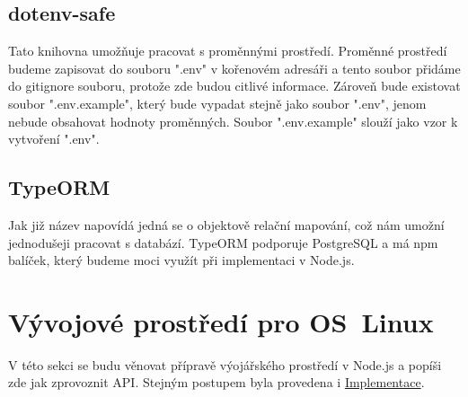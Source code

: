 \documentclass[thesis=B,czech]{FITthesis}[2012/06/26]
\begin{document}
        \subsection{dotenv-safe}
            Tato knihovna umožňuje pracovat s proměnnými prostředí. Proměnné prostředí budeme zapisovat do souboru ".env" v kořenovém adresáři a tento soubor přidáme do gitignore souboru, protože zde budou citlivé informace. Zároveň bude existovat soubor ".env.example", který bude vypadat stejně jako soubor ".env", jenom nebude obsahovat hodnoty proměnných. Soubor ".env.example" slouží jako vzor k vytvoření ".env". \cite{dotenv}
        \subsection{TypeORM}
            Jak již název napovídá jedná se o objektově relační mapování, což nám umožní jednodušeji pracovat s databází. TypeORM podporuje PostgreSQL a má npm balíček, který budeme moci využít při implementaci v Node.js.
            \cite{typeorm}
    \section{Vývojové prostředí pro OS~Linux}  \label{vyvProstredi}
        V této sekci se budu věnovat přípravě výojářského prostředí v Node.js a popíši zde jak zprovoznit API. Stejným postupem byla provedena i \hyperref[impl]{Implementace}.
        
\end{document}
